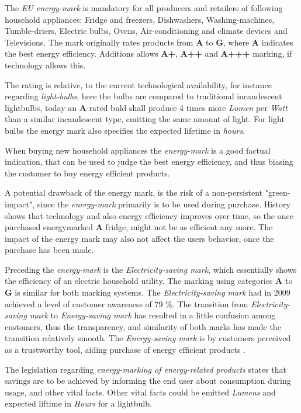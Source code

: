 \documentclass[journal]{IEEEtran}
\begin{document}
The \textit{EU energy-mark} is mandatory for all producers and retailers of following household appliances: 
Fridge and freezers, Dishwashers, Washing-machines, Tumble-driers, Electric bulbs, Ovens, 
Air-conditioning and climate devices and Televisions.
The mark originally rates products from \textbf{A} to \textbf{G}, where \textbf{A} indicates the best energy efficiency. 
Additions allows \textbf{A+}, \textbf{A++} and \textbf{A+++} marking, if technology allows this. \cite{energymark}

The rating is relative, to the current technological availability, for instance regarding \textit{light-bulbs}, 
here the bulbs are compared to traditional incandescent lightbulbs, today an \textbf{A}-rated buld shall produce 4 times more \textit{Lumen} per \textit{Watt} than a similar incandescent type, emitting the same amount of light. For light  bulbs the energy mark also specifies the expected lifetime in \textit{hours}.

When buying new household appliances the \textit{energy-mark} is a good factual indication, that can be used to judge the
best energy efficiency, and thus biasing the customer to buy energy efficient products. 

A potential drawback of the energy mark, is the risk of a non-persistent "green-impact", since the \textit{energy-mark} 
primarily is to be used during purchase. History shows that technology and also energy efficiency improves over time, so the once purchased energymarked \textbf{A} fridge, might not be as efficient any more. The impact of the energy mark may also not affect the users behavior, once the purchase has been made.  

Preceding the \textit{energy-mark} is the \textit{Electricity-saving mark}, which essentially shows the efficiency of an electric household utility. The marking using categories \textbf{A} to \textbf{G} is similar for both marking systems. 
The \textit{Electricity-saving mark} had in 2009 achieved a level of customer awareness of 79 \%. The transition from \textit{Electricity-saving mark} to \textit{Energy-saving mark} has resulted in a little confusion among customers, thus the transparency, and similarity of both marks has made the transition relatively smooth. \cite{annual_ens_10}
The \textit{Energy-saving mark} is by customers perceived as a trustworthy tool, aiding purchase of energy efficient products \cite{keylist}.

The legislation regarding \textit{energy-marking of energy-related products} states that savings are to be achieved by informing the end user about consumption during usage, and other vital facts. \cite{energylaw1} Other vital facts could be emitted \textit{Lumens} and expected liftime in \textit{Hours} for a lightbulb.\newline 
\end{document}
